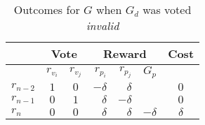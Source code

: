 \begin{table}[hbt]
    \caption{Outcomes for $G$ when $G_d$ was voted \emph{invalid}}
    \begin{tabular}{lccrrrc}
    \toprule
        \hspace   & \multicolumn{2}{c}{Vote} & \multicolumn{3}{c}{Reward} & Cost                     \\
    \midrule
        \hspace   & $r_{v_i}$  & $r_{v_j}$   & $r_{p_i}$ & $r_{p_j}$ & $G_p$     &                   \\
    \addlinespace[0.5em]
        $r_{n-2}$ & $1$        & $0$         & $-\delta$ & $\delta$  &           & $0$               \\
        $r_{n-1}$ & $0$        & $1$         & $\delta$  & $-\delta$ &           & $0$               \\
        $r_{n}$   & $0$        & $0$         & $\delta$  & $\delta$  & $-\delta$ & $\delta$          \\
    \bottomrule
    \end{tabular}
\end{table}

